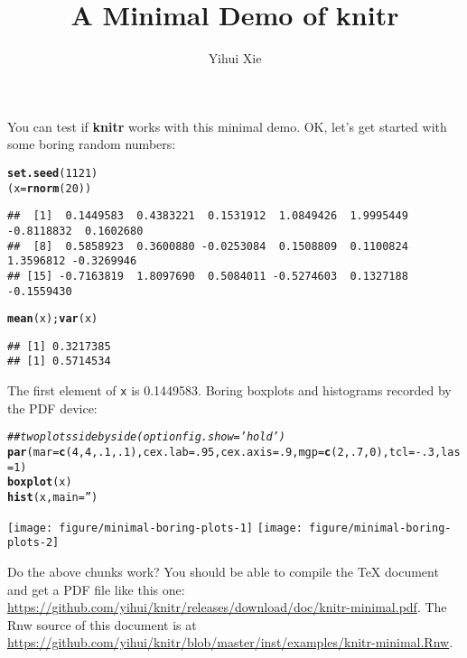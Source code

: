 \documentclass{article}\usepackage[]{graphicx}\usepackage[]{xcolor}
\makeatletter
\newcommand{\hlnum}[1]{\textcolor[rgb]{0.686,0.059,0.569}{#1}}%
\newcommand{\hlstr}[1]{\textcolor[rgb]{0.192,0.494,0.8}{#1}}%
\newcommand{\hlcom}[1]{\textcolor[rgb]{0.678,0.584,0.686}{\textit{#1}}}%
\newcommand{\hlopt}[1]{\textcolor[rgb]{0,0,0}{#1}}%
\newcommand{\hlstd}[1]{\textcolor[rgb]{0.345,0.345,0.345}{#1}}%
\newcommand{\hlkwb}[1]{\textcolor[rgb]{0.69,0.353,0.396}{#1}}%
\newcommand{\hlkwc}[1]{\textcolor[rgb]{0.333,0.667,0.333}{#1}}%
\newcommand{\hlkwd}[1]{\textcolor[rgb]{0.737,0.353,0.396}{\textbf{#1}}}%
\newenvironment{kframe}{%
 \def\at@end@of@kframe{}%
 \ifinner\ifhmode%
  \def\at@end@of@kframe{\end{minipage}}%
  \begin{minipage}{\columnwidth}%
 \fi\fi%
 \def\FrameCommand##1{\hskip\@totalleftmargin \hskip-\fboxsep
 \colorbox{shadecolor}{##1}\hskip-\fboxsep
     \hskip-\linewidth \hskip-\@totalleftmargin \hskip\columnwidth}%
 \MakeFramed {\advance\hsize-\width
   \@totalleftmargin\z@ \linewidth\hsize
   \@setminipage}}%
 {\par\unskip\endMakeFramed%
 \at@end@of@kframe}
\newenvironment{knitrout}{}{} %
\makeatother
\begin{document}
\title{A Minimal Demo of knitr}

\author{Yihui Xie}

\maketitle
You can test if \textbf{knitr} works with this minimal demo. OK, let's
get started with some boring random numbers:

\begin{knitrout}
\color{fgcolor}\begin{kframe}
\begin{alltt}
\hlkwd{set.seed}\hlstd{(}\hlnum{1121}\hlstd{)}
\hlstd{(x}\hlkwb{=}\hlkwd{rnorm}\hlstd{(}\hlnum{20}\hlstd{))}
\end{alltt}
\begin{verbatim}
##  [1]  0.1449583  0.4383221  0.1531912  1.0849426  1.9995449 -0.8118832  0.1602680
##  [8]  0.5858923  0.3600880 -0.0253084  0.1508809  0.1100824  1.3596812 -0.3269946
## [15] -0.7163819  1.8097690  0.5084011 -0.5274603  0.1327188 -0.1559430
\end{verbatim}
\begin{alltt}
\hlkwd{mean}\hlstd{(x);}\hlkwd{var}\hlstd{(x)}
\end{alltt}
\begin{verbatim}
## [1] 0.3217385
## [1] 0.5714534
\end{verbatim}
\end{kframe}
\end{knitrout}

The first element of \texttt{x} is 0.1449583. Boring boxplots
and histograms recorded by the PDF device:

\begin{knitrout}
\color{fgcolor}\begin{kframe}
\begin{alltt}
\hlcom{## two plots side by side (option fig.show='hold')}
\hlkwd{par}\hlstd{(}\hlkwc{mar}\hlstd{=}\hlkwd{c}\hlstd{(}\hlnum{4}\hlstd{,}\hlnum{4}\hlstd{,}\hlnum{.1}\hlstd{,}\hlnum{.1}\hlstd{),}\hlkwc{cex.lab}\hlstd{=}\hlnum{.95}\hlstd{,}\hlkwc{cex.axis}\hlstd{=}\hlnum{.9}\hlstd{,}\hlkwc{mgp}\hlstd{=}\hlkwd{c}\hlstd{(}\hlnum{2}\hlstd{,}\hlnum{.7}\hlstd{,}\hlnum{0}\hlstd{),}\hlkwc{tcl}\hlstd{=}\hlopt{-}\hlnum{.3}\hlstd{,}\hlkwc{las}\hlstd{=}\hlnum{1}\hlstd{)}
\hlkwd{boxplot}\hlstd{(x)}
\hlkwd{hist}\hlstd{(x,}\hlkwc{main}\hlstd{=}\hlstr{''}\hlstd{)}
\end{alltt}
\end{kframe}

{\centering \texttt{[image: figure/minimal-boring-plots-1]} 
\texttt{[image: figure/minimal-boring-plots-2]} 

}


\end{knitrout}

Do the above chunks work? You should be able to compile the \TeX{}
document and get a PDF file like this one: \url{https://github.com/yihui/knitr/releases/download/doc/knitr-minimal.pdf}.
The Rnw source of this document is at \url{https://github.com/yihui/knitr/blob/master/inst/examples/knitr-minimal.Rnw}.
\end{document}
